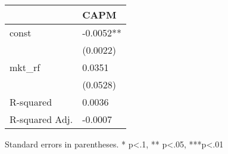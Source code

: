 \begin{table}
\caption{}
\label{}
\begin{center}
\begin{tabular}{ll}
\hline
               & CAPM       \\
\hline
const          & -0.0052**  \\
               & (0.0022)   \\
mkt\_rf        & 0.0351     \\
               & (0.0528)   \\
R-squared      & 0.0036     \\
R-squared Adj. & -0.0007    \\
\hline
\end{tabular}
\end{center}
\end{table}
\bigskip
Standard errors in parentheses. \newline 
* p<.1, ** p<.05, ***p<.01